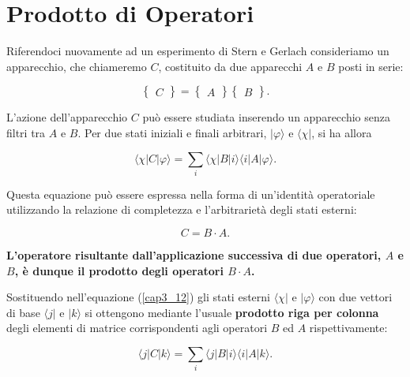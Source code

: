 \documentclass[a4paper,12pt,oneside]{book}
\begin{document}
\section{Prodotto di Operatori}

Riferendoci nuovamente ad un esperimento di Stern e Gerlach consideriamo un apparecchio, che chiameremo $C$, costituito da due apparecchi $A$ e $B$ posti in serie:

\begin{equation}
\begin{Bmatrix}
C
\end{Bmatrix}=
\begin{Bmatrix}
A
\end{Bmatrix}
\begin{Bmatrix}
B
\end{Bmatrix} .
\end{equation}

L'azione dell'apparecchio $C$ può essere studiata inserendo un apparecchio senza filtri tra $A$ e $B$. Per due stati iniziali e finali arbitrari, $| \varphi \rangle $ e $\langle \chi |$, si ha allora

\begin{equation}
\langle \chi | C | \varphi \rangle = \sum \limits_{i} \langle \chi | B | i \rangle \langle i | A | \varphi \rangle .
\label{cap3_12}
\end{equation}

Questa equazione può essere espressa nella forma di un'identità operatoriale utilizzando la relazione di completezza e l'arbitrarietà degli stati esterni:

\begin{equation}
C= B \cdot A .
\end{equation}

\textbf{L'operatore risultante dall'applicazione successiva di due operatori, $A$ e $B$, è dunque il prodotto degli operatori $B \cdot A$.}

Sostituendo nell'equazione (\ref{cap3_12}) gli stati esterni $\langle \chi |$ e $ | \varphi \rangle $ con due vettori di base $\langle j |$ e $| k \rangle$ si ottengono mediante l'usuale \textbf{prodotto riga per colonna} degli elementi di matrice corrispondenti agli operatori $B$ ed $A$ rispettivamente:

\begin{equation}
\langle j | C | k \rangle  = \sum \limits_{i} \langle j | B | i \rangle \langle i | A | k \rangle .
\end{equation}
\end{document}
